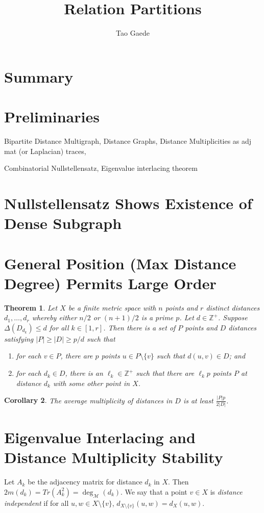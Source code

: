 \documentclass[12pt]{article}
\title{ \vspace{-3cm} Relation Partitions}
\author{Tao Gaede}
\newcommand{\Z}{\mathbb{Z}}
\newtheorem{thm}{Theorem}[section] %
\newtheorem{cor}[thm]{Corollary}
\theoremstyle{definition}
\begin{document}
	\maketitle
	
	\section{Summary}
	
	\section{Preliminaries}
	
	Bipartite Distance Multigraph, Distance Graphs, Distance Multiplicities as adj mat (or Laplacian) traces,
	
	Combinatorial Nullstellensatz, Eigenvalue interlacing theorem
	
	\section{Nullstellensatz Shows Existence of Dense Subgraph}
	
	\section{General Position (Max Distance Degree) Permits Large Order}
	
	\begin{thm}
		Let $X$ be a finite metric space with $n$ points and $r$ distinct distances $d_1, \ldots, d_r$ whereby either $n/2$ or $(n+1)/2$ is a prime $p$.  Let $d \in \Z^+$.  Suppose $\Delta(D_{d_k}) \leq d$ for all $k \in [1,r]$.  Then there is a set of $P$ points and $D$ distances satisfying $|P| \geq |D| \geq p/d$ such that 
		\begin{enumerate}
			\item for each $v \in P$, there are $p$ points $u \in P \setminus \{v\}$ such that $d(u,v) \in D$; and
			\item for each $d_k \in D$, there is an $\ell_k \in \Z^+$ such that there are $\ell_k p$ points $P$ at distance $d_k$ with some other point in $X$.
		\end{enumerate}
	\end{thm}

	\begin{cor}
		The average multiplicity of distances in $D$ is at least $\frac{|P|p}{2|D|}$.
	\end{cor}
	
	\section{Eigenvalue Interlacing and Distance Multiplicity Stability}
	Let $A_k$ be the adjacency matrix for distance $d_k$ in $X$.  Then $2m(d_k) = Tr(A_k^2) = \deg_{\mathcal{M}}(d_k)$.  We say that a point $v \in X$ is \emph{distance independent} if for all $u,w \in X \setminus \{v\}$, $d_{X \setminus \{v\}}(u,w) = d_{X}(u,w)$.
	
\end{document}
